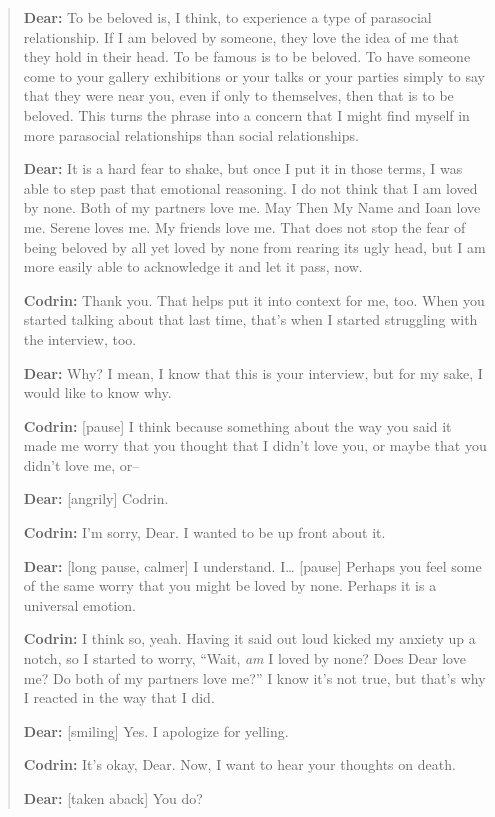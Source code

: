 \begin{quote}
\textbf{Dear:} To be beloved is, I think, to experience a type of parasocial relationship. If I am beloved by someone, they love the idea of me that they hold in their head. To be famous is to be beloved. To have someone come to your gallery exhibitions or your talks or your parties simply to say that they were near you, even if only to themselves, then that is to be beloved. This turns the phrase into a concern that I might find myself in more parasocial relationships than social relationships.

\textbf{Dear:} It is a hard fear to shake, but once I put it in those terms, I was able to step past that emotional reasoning. I do not think that I am loved by none. Both of my partners love me. May Then My Name and Ioan love me. Serene loves me. My friends love me. That does not stop the fear of being beloved by all yet loved by none from rearing its ugly head, but I am more easily able to acknowledge it and let it pass, now.

\textbf{Codrin:} Thank you. That helps put it into context for me, too. When you started talking about that last time, that's when I started struggling with the interview, too.

\textbf{Dear:} Why? I mean, I know that this is your interview, but for my sake, I would like to know why.

\textbf{Codrin:} {[}pause{]} I think because something about the way you said it made me worry that you thought that I didn't love you, or maybe that you didn't love me, or--

\textbf{Dear:} {[}angrily{]} Codrin.

\textbf{Codrin:} I'm sorry, Dear. I wanted to be up front about it.

\textbf{Dear:} {[}long pause, calmer{]} I understand. I\ldots{} {[}pause{]} Perhaps you feel some of the same worry that you might be loved by none. Perhaps it is a universal emotion.

\textbf{Codrin:} I think so, yeah. Having it said out loud kicked my anxiety up a notch, so I started to worry, ``Wait, \emph{am} I loved by none? Does Dear love me? Do both of my partners love me?'' I know it's not true, but that's why I reacted in the way that I did.

\textbf{Dear:} {[}smiling{]} Yes. I apologize for yelling.

\textbf{Codrin:} It's okay, Dear. Now, I want to hear your thoughts on death.

\textbf{Dear:} {[}taken aback{]} You do?


\end{quote}
